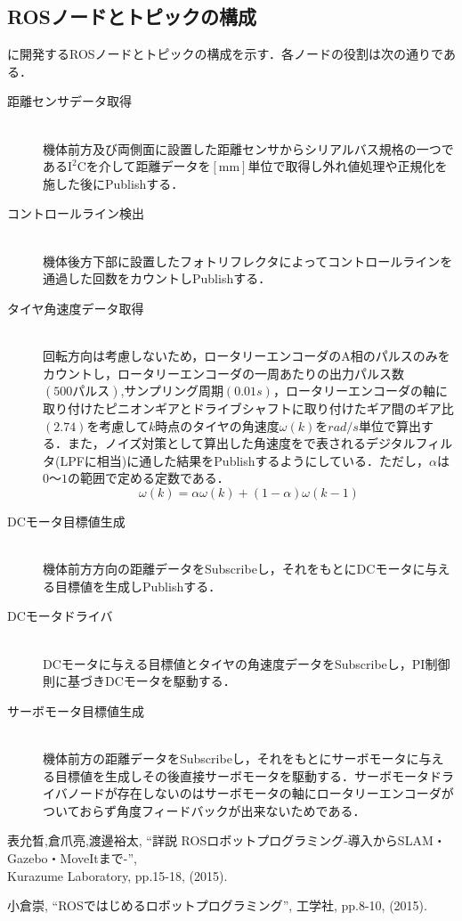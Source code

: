 \newpage
\subsection{ROSノードとトピックの構成}
に開発するROSノードとトピックの構成を示す．各ノードの役割は次の通りである．
\begin{description}

    \item[距離センサデータ取得] \mbox{} \\
      機体前方及び両側面に設置した距離センサからシリアルバス規格の一つである$\mathrm{I^2C}$を介して距離データを$\mathrm{[mm]}$単位で取得し外れ値処理や正規化を施した後にPublishする．
    \item[コントロールライン検出] \mbox{} \\
      機体後方下部に設置したフォトリフレクタによってコントロールラインを通過した回数をカウントしPublishする．

    \item[タイヤ角速度データ取得] \mbox{} \\
      回転方向は考慮しないため，ロータリーエンコーダのA相のパルスのみをカウントし，ロータリーエンコーダの一周あたりの出力パルス数$(500パルス)$,サンプリング周期$(0.01\unit{s})$，ロータリーエンコーダの軸に取り付けたピニオンギアとドライブシャフトに取り付けたギア間のギア比$(2.74)$を考慮して$k$時点のタイヤの角速度$\omega(k)$を$\unit{rad/s}$単位で算出する．また，ノイズ対策として算出した角速度をで表されるデジタルフィルタ(LPFに相当)に通した結果をPublishするようにしている．ただし，$\alpha$は$0〜1$の範囲で定める定数である．\\
      \begin{equation}
      	\omega(k)=\alpha\omega(k)+(1-\alpha)\omega(k-1)\label{eq::lpf}
      \end{equation}

    \item[DCモータ目標値生成] \mbox{} \\
      機体前方方向の距離データをSubscribeし，それをもとにDCモータに与える目標値を生成しPublishする．

    \item[DCモータドライバ] \mbox{} \\
      DCモータに与える目標値とタイヤの角速度データをSubscribeし，PI制御則に基づきDCモータを駆動する．

    \item[サーボモータ目標値生成] \mbox{} \\
      機体前方の距離データをSubscribeし，それをもとにサーボモータに与える目標値を生成しその後直接サーボモータを駆動する．サーボモータドライバノードが存在しないのはサーボモータの軸にロータリーエンコーダがついておらず角度フィードバックが出来ないためである．

  \end{description}

\begin{thebibliography}{9}
    表允晳,倉爪亮,渡邊裕太, ``詳説 ROSロボットプログラミング-導入からSLAM・Gazebo・MoveItまで-'', \\
    Kurazume Laboratory, pp.15-18, (2015).

    小倉崇, ``ROSではじめるロボットプログラミング'', 工学社, pp.8-10, (2015).

\end{thebibliography}
